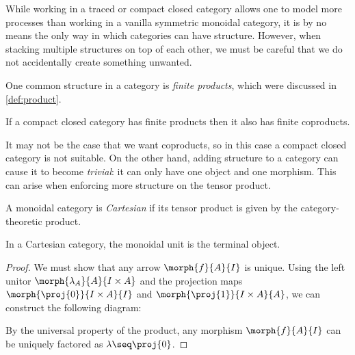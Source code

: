 While working in a traced or compact closed category allows one to model more
processes than working in a vanilla symmetric monoidal category, it is by no
means the only way in which categories can have structure.
However, when stacking multiple structures on top of each other, we must be
careful that we do not accidentally create something unwanted.

One common structure in a category is \emph{finite products}, which were
discussed in \cref{def:product}.

\begin{theorem}
    If a compact closed category has finite products then it also has finite
    coproducts.
\end{theorem}

It may not be the case that we want coproducts, so in this case a compact closed
category is not suitable.
On the other hand, adding structure to a category can cause it to become
\emph{trivial}: it can only have one object and one morphism.
This can arise when enforcing more structure on the tensor product.

\begin{definition}\label{def:cartesian-category}
    A monoidal category is \emph{Cartesian} if its tensor product is given by
    the category-theoretic product.
\end{definition}

\begin{lemma}
    In a Cartesian category, the monoidal unit is the terminal object.
\end{lemma}
\begin{proof}
    We must show that any arrow \(\morph{f}{A}{I}\) is unique.
    Using the left unitor \(\morph{\lambda_A}{A}{I \times A}\) and the
    projection maps \(\morph{\proj{0}}{I \times A}{I}\) and
    \(\morph{\proj{1}}{I \times A}{A}\), we can construct the following diagram:
    \begin{center}
        \vspace{0.5em}
    \end{center}
    By the universal property of the product, any morphism \(\morph{f}{A}{I}\)
    can be uniquely factored as \(\lambda \seq \proj{0}\).
\end{proof}


